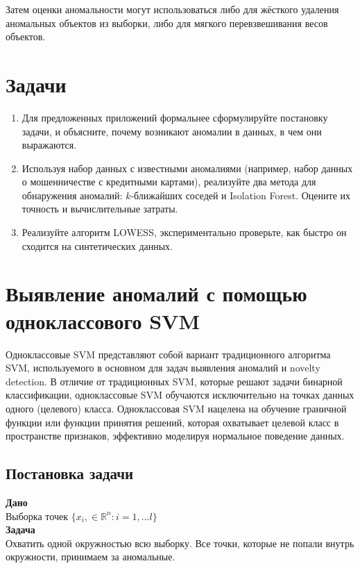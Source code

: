 Затем оценки аномальности могут использоваться либо для жёсткого удаления аномальных объектов из выборки, либо для мягкого перевзвешивания весов объектов.

\section{Задачи}
\begin{enumerate}
    \item Для предложенных приложений формальнее сформулируйте постановку задачи, и объясните, почему возникают аномалии в данных, в чем они выражаются.
    \item Используя набор данных с известными аномалиями (например, набор данных о мошенничестве с кредитными картами), реализуйте два метода для обнаружения аномалий: $k$-ближайших соседей и Isolation Forest. Оцените их точность и вычислительные затраты.
    \item Реализуйте алгоритм LOWESS, экспериментально проверьте, как быстро он сходится на синтетических данных.
\end{enumerate}

\section*{Выявление аномалий с помощью одноклассового SVM}

Одноклассовые SVM представляют собой вариант традиционного алгоритма SVM, используемого в основном для задач выявления аномалий и novelty detection. В отличие от традиционных SVM, которые решают задачи бинарной классификации, одноклассовые SVM обучаются исключительно на точках данных одного (целевого) класса. Одноклассовая SVM нацелена на обучение граничной функции или функции принятия решений, которая охватывает целевой класс в пространстве признаков, эффективно моделируя нормальное поведение данных.
\\

\subsection{Постановка задачи}

\textbf{Дано} \\

Выборка точек $\{x_i, \in \mathbb{R}^n : i = 1, ... l\}$\\

\textbf{Задача} \\

Охватить одной окружностью всю выборку. Все точки, которые не попали внутрь окружности, принимаем за аномальные.\\

